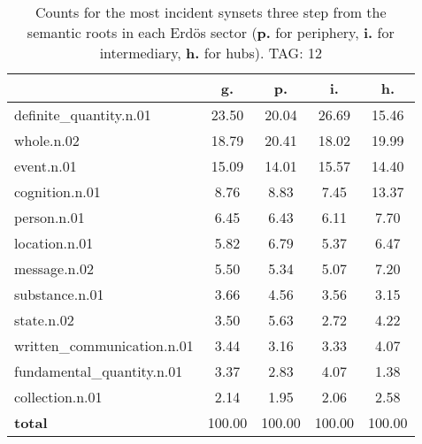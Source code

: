 \begin{table}[h!]
\begin{center}
\begin{tabular}{| l | c | c | c | c |}\hline
 & g. & p. & i. & h. \\\hline
definite\_quantity.n.01 & 23.50  & 20.04  & 26.69  & 15.46 \\\hline
whole.n.02 & 18.79  & 20.41  & 18.02  & 19.99 \\\hline
event.n.01 & 15.09  & 14.01  & 15.57  & 14.40 \\\hline
cognition.n.01 & 8.76  & 8.83  & 7.45  & 13.37 \\\hline
person.n.01 & 6.45  & 6.43  & 6.11  & 7.70 \\\hline
location.n.01 & 5.82  & 6.79  & 5.37  & 6.47 \\\hline
message.n.02 & 5.50  & 5.34  & 5.07  & 7.20 \\\hline
substance.n.01 & 3.66  & 4.56  & 3.56  & 3.15 \\\hline
state.n.02 & 3.50  & 5.63  & 2.72  & 4.22 \\\hline
written\_communication.n.01 & 3.44  & 3.16  & 3.33  & 4.07 \\\hline
fundamental\_quantity.n.01 & 3.37  & 2.83  & 4.07  & 1.38 \\\hline
collection.n.01 & 2.14  & 1.95  & 2.06  & 2.58 \\\hline
{{\bf total}} & 100.00  & 100.00  & 100.00  & 100.00 \\\hline
\end{tabular}
\caption{Counts for the most incident synsets three step from the semantic roots in each Erd\"os sector ({\bf p.} for periphery, {\bf i.} for intermediary, {\bf h.} for hubs). TAG: 12}
\end{center}
\end{table}